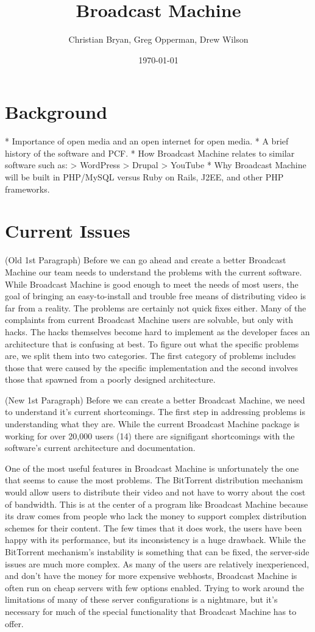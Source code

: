 \documentclass[a4paper,12pt]{report}
\author{Christian Bryan, Greg Opperman, Drew Wilson}
\date{\today}
\title{Broadcast Machine}
\begin{document}
\maketitle

\tableofcontents

\chapter{Background}
* Importance of open media and an open internet for open media.
	* A brief history of the software and PCF.
	* How Broadcast Machine relates to similar software such as:
		> WordPress
		> Drupal
		> YouTube
	* Why Broadcast Machine will be built in PHP/MySQL versus Ruby on Rails, J2EE, and other PHP frameworks.

\chapter{Current Issues}
(Old 1st Paragraph)
	Before we can go ahead and create a better Broadcast Machine our team needs to understand the problems with the current software. While Broadcast Machine is good enough to meet the needs of most users, the goal of bringing an easy-to-install and trouble free means of distributing video is far from a reality. The problems are certainly not quick fixes either. Many of the complaints from current Broadcast Machine users are solvable, but only with hacks. The hacks themselves become hard to implement as the developer faces an architecture that is confusing at best. To figure out what the specific problems are, we split them into two categories. The first category of problems includes those that were caused by the specific implementation and the second involves those that spawned from a poorly designed architecture.

(New 1st Paragraph)
	Before we can create a better Broadcast Machine, we need to understand it's current shortcomings. The first step in addressing problems is understanding what they are. While the current Broadcast Machine package is working for over 20,000 users (14) there are signifigant shortcomings with the software's current architecture and documentation.
	
	One of the most useful features in Broadcast Machine is unfortunately the one that seems to cause the most problems. The BitTorrent distribution mechanism would allow users to distribute their video and not have to worry about the cost of bandwidth. This is at the center of a program like Broadcast Machine because its draw comes from people who lack the money to support complex distribution schemes for their content. The few times that it does work, the users have been happy with its performance, but its inconsistency is a huge drawback. While the BitTorrent mechanism’s instability is something that can be fixed, the server-side issues are much more complex. As many of the users are relatively inexperienced, and don’t have the money for more expensive webhosts, Broadcast Machine is often run on cheap servers with few options enabled. Trying to work around the limitations of many of these server configurations is a nightmare, but it’s necessary for much of the special functionality that Broadcast Machine has to offer.
\end{document}
